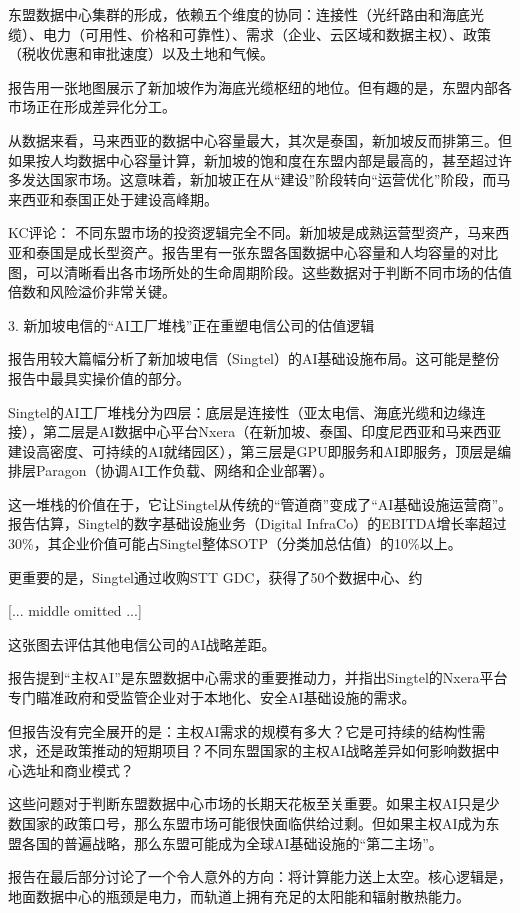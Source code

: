 \documentclass[11pt]{ctexart}
\begin{document}
东盟数据中心集群的形成，依赖五个维度的协同：连接性（光纤路由和海底光缆）、电力（可用性、价格和可靠性）、需求（企业、云区域和数据主权）、政策（税收优惠和审批速度）以及土地和气候。

报告用一张地图展示了新加坡作为海底光缆枢纽的地位。但有趣的是，东盟内部各市场正在形成差异化分工。

从数据来看，马来西亚的数据中心容量最大，其次是泰国，新加坡反而排第三。但如果按人均数据中心容量计算，新加坡的饱和度在东盟内部是最高的，甚至超过许多发达国家市场。这意味着，新加坡正在从“建设”阶段转向“运营优化”阶段，而马来西亚和泰国正处于建设高峰期。

KC评论： 不同东盟市场的投资逻辑完全不同。新加坡是成熟运营型资产，马来西亚和泰国是成长型资产。报告里有一张东盟各国数据中心容量和人均容量的对比图，可以清晰看出各市场所处的生命周期阶段。这些数据对于判断不同市场的估值倍数和风险溢价非常关键。

3. 新加坡电信的“AI工厂堆栈”正在重塑电信公司的估值逻辑

报告用较大篇幅分析了新加坡电信（Singtel）的AI基础设施布局。这可能是整份报告中最具实操价值的部分。

Singtel的AI工厂堆栈分为四层：底层是连接性（亚太电信、海底光缆和边缘连接），第二层是AI数据中心平台Nxera（在新加坡、泰国、印度尼西亚和马来西亚建设高密度、可持续的AI就绪园区），第三层是GPU即服务和AI即服务，顶层是编排层Paragon（协调AI工作负载、网络和企业部署）。

这一堆栈的价值在于，它让Singtel从传统的“管道商”变成了“AI基础设施运营商”。报告估算，Singtel的数字基础设施业务（Digital InfraCo）的EBITDA增长率超过30\%，其企业价值可能占Singtel整体SOTP（分类加总估值）的10\%以上。

更重要的是，Singtel通过收购STT GDC，获得了50个数据中心、约

[... middle omitted ...]

这张图去评估其他电信公司的AI战略差距。

报告提到“主权AI”是东盟数据中心需求的重要推动力，并指出Singtel的Nxera平台专门瞄准政府和受监管企业对于本地化、安全AI基础设施的需求。

但报告没有完全展开的是：主权AI需求的规模有多大？它是可持续的结构性需求，还是政策推动的短期项目？不同东盟国家的主权AI战略差异如何影响数据中心选址和商业模式？

这些问题对于判断东盟数据中心市场的长期天花板至关重要。如果主权AI只是少数国家的政策口号，那么东盟市场可能很快面临供给过剩。但如果主权AI成为东盟各国的普遍战略，那么东盟可能成为全球AI基础设施的“第二主场”。

报告在最后部分讨论了一个令人意外的方向：将计算能力送上太空。核心逻辑是，地面数据中心的瓶颈是电力，而轨道上拥有充足的太阳能和辐射散热能力。
\end{document}
